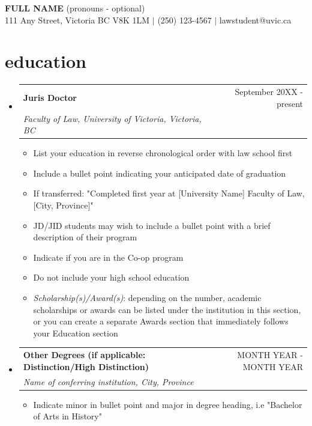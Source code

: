 \documentclass[letterpaper,11pt]{article}
\makeatletter
\newcommand{\resumeItem}[1]{
  \item\small{
    {#1 \vspace{-4pt}}
  }
}
\newcommand{\resumeSubheading}[4]{
  \vspace{-2pt}\item
    \begin{tabular*}{0.97\textwidth}[t]{l@{\extracolsep{\fill}}r}
      \vspace{-2pt}
      \textbf{#1} & #2 \\
      \vspace{-1pt}
      \textit{\small#3} & \textit{\small #4} \\
    \end{tabular*}\vspace{-7pt}
}
\newcommand{\resumeSubHeadingListStart}{\begin{itemize}[leftmargin=0.15in, label={}]}
\newcommand{\resumeSubHeadingListEnd}{\end{itemize}}
\newcommand{\resumeItemListStart}{\begin{itemize}}
\newcommand{\resumeItemListEnd}{\end{itemize}\vspace{-5pt}}
\makeatother
\begin{document}

\begin{center}
    \textbf{\huge \uppercase{Full Name}} \textnormal{(pronouns - optional)}\\ \vspace{1pt}
    \small 111 Any Street, Victoria BC V8K 1LM $|$ (250) 123-4567 $|$ lawstudent@uvic.ca 
\end{center}


\section{education}
  \resumeSubHeadingListStart
    \resumeSubheading
      {Juris Doctor}{September 20XX - present}
      {Faculty of Law, University of Victoria, Victoria, BC}{}
      \resumeItemListStart
        \resumeItem{List your education in reverse chronological order with law school first}
        \resumeItem{Include a bullet point indicating your anticipated date of graduation}
        \resumeItem{If transferred: "Completed first year at [University Name] Faculty of Law, [City, Province]"}
        \resumeItem{JD/JID students may wish to include a bullet point with a brief description of their program}
        \resumeItem{Indicate if you are in the Co-op program}
        \resumeItem{Do not include your high school education}
        \resumeItem{\textit{Scholarship(s)/Award(s)}: depending on the number, academic scholarships or awards can be listed under the institution in this section, or you can create a separate Awards section that immediately follows your Education section}
      \resumeItemListEnd
    \vspace{4pt}
    \resumeSubheading
      {Other Degrees (if applicable: Distinction/High Distinction)}{MONTH YEAR - MONTH YEAR}
      {Name of conferring institution, City, Province}{}
      \resumeItemListStart
        \resumeItem{Indicate minor in bullet point and major in degree heading, i.e "Bachelor of Arts in History"}
      \resumeItemListEnd
  \resumeSubHeadingListEnd
\end{document}
